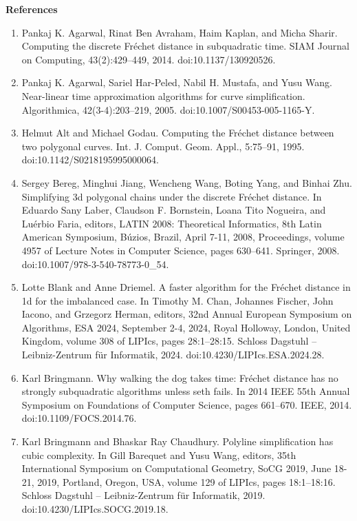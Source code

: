 \documentclass[10pt,a4paper]{article}
\begin{document}
\par\medskip\noindent\textbf{References}\par
\begin{enumerate}
\item[]  [1]  Pankaj K. Agarwal, Rinat Ben Avraham, Haim Kaplan, and Micha Sharir.  Computing the discrete Fréchet distance in subquadratic time.  SIAM Journal on Computing, 43(2):429–449, 2014.  doi:10.1137/130920526.  
\item[]  [2]  Pankaj K. Agarwal, Sariel Har-Peled, Nabil H. Mustafa, and Yusu Wang.  Near-linear time approximation algorithms for curve simplification.  Algorithmica, 42(3-4):203–219, 2005.  doi:10.1007/S00453-005-1165-Y.  
\item[]  [3]  Helmut Alt and Michael Godau.  Computing the Fréchet distance between two polygonal curves.  Int. J. Comput. Geom. Appl., 5:75–91, 1995.  doi:10.1142/S0218195995000064.  
\item[]  [4]  Sergey Bereg, Minghui Jiang, Wencheng Wang, Boting Yang, and Binhai Zhu.  Simplifying 3d polygonal chains under the discrete Fréchet distance.  In Eduardo Sany Laber, Claudson F. Bornstein, Loana Tito Nogueira, and Luérbio Faria, editors, LATIN 2008: Theoretical Informatics, 8th Latin American Symposium, Búzios, Brazil, April 7-11, 2008, Proceedings, volume 4957 of Lecture Notes in Computer Science, pages 630–641. Springer, 2008.  doi:10.1007/978-3-540-78773-0\_54.  
\item[]  [5]  Lotte Blank and Anne Driemel.  A faster algorithm for the Fréchet distance in 1d for the imbalanced case.  In Timothy M. Chan, Johannes Fischer, John Iacono, and Grzegorz Herman, editors, 32nd Annual European Symposium on Algorithms, ESA 2024, September 2-4, 2024, Royal Holloway, London, United Kingdom, volume 308 of LIPIcs, pages 28:1–28:15. Schloss Dagstuhl – Leibniz-Zentrum für Informatik, 2024.  doi:10.4230/LIPIcs.ESA.2024.28.  
\item[]  [6]  Karl Bringmann.  Why walking the dog takes time: Fréchet distance has no strongly subquadratic algorithms unless seth fails.  In 2014 IEEE 55th Annual Symposium on Foundations of Computer Science, pages 661–670. IEEE, 2014.  doi:10.1109/FOCS.2014.76.  
\item[]  [7]  Karl Bringmann and Bhaskar Ray Chaudhury.  Polyline simplification has cubic complexity.  In Gill Barequet and Yusu Wang, editors, 35th International Symposium on Computational Geometry, SoCG 2019, June 18-21, 2019, Portland, Oregon, USA, volume 129 of LIPIcs, pages 18:1–18:16. Schloss Dagstuhl – Leibniz-Zentrum für Informatik, 2019.  doi:10.4230/LIPIcs.SOCG.2019.18.  

\end{enumerate}
\end{document}
